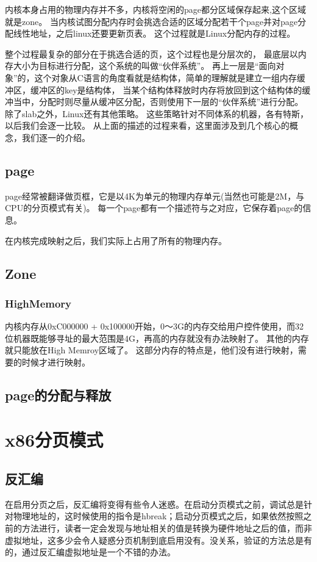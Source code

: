 内核本身占用的物理内存并不多，内核将空闲的page都分区域保存起来,这个区域就是zone。
当内核试图分配内存时会挑选合适的区域分配若干个page并对page分配线性地址，之后linux还要更新页表。
这个过程就是Linux分配内存的过程。


整个过程最复杂的部分在于挑选合适的页，这个过程也是分层次的， 最底层以内存大小为目标进行分配，这个系统的叫做“伙伴系统”。
再上一层是“面向对象”的，这个对象从C语言的角度看就是结构体，简单的理解就是建立一组内存缓冲区，缓冲区的key是结构体， 当某个结构体释放时内存将放回到这个结构体的缓冲当中，分配时则尽量从缓冲区分配，否则使用下一层的“伙伴系统”进行分配。
除了slab之外，Linux还有其他策略。
这些策略针对不同体系的机器，各有特斯，以后我们会逐一比较。
从上面的描述的过程来看，这里面涉及到几个核心的概念，我们逐一的介绍。

\subsection{page}
page经常被翻译做页框，它是以4K为单元的物理内存单元(当然也可能是2M，与CPU的分页模式有关)。
每一个page都有一个描述符与之对应，它保存着page的信息。


在内核完成映射之后，我们实际上占用了所有的物理内存。
\subsection{Zone}

\subsubsection{HighMemory}
内核内存从0xC000000 + 0x100000开始，0～3G的内存交给用户控件使用，而32位机器既能够寻址的最大范围是4G，再高的内存就没有办法映射了。
其他的内存就只能放在High Memroy区域了。
这部分内存的特点是，他们没有进行映射，需要的时候才进行映射。

\subsection{page的分配与释放}


\section{x86分页模式}

\subsection{反汇编}
在启用分页之后，反汇编将变得有些令人迷惑。在启动分页模式之前，调试总是针对物理地址的，这时候使用的指令是hbreak；启动分页模式之后，如果依然按照之前的方法进行，读者一定会发现与地址相关的值是转换为硬件地址之后的值，而非虚拟地址，这多少会令人疑惑分页机制到底启用没有。没关系，验证的方法总是有的，通过反汇编虚拟地址是一个不错的办法。


